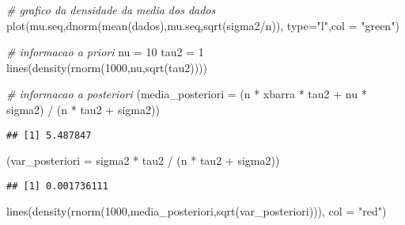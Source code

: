 \documentclass[
]{article}
\newenvironment{Shaded}{\begin{snugshade}}{\end{snugshade}}
\newcommand{\AttributeTok}[1]{\textcolor[rgb]{0.77,0.63,0.00}{#1}}
\newcommand{\CommentTok}[1]{\textcolor[rgb]{0.56,0.35,0.01}{\textit{#1}}}
\newcommand{\DecValTok}[1]{\textcolor[rgb]{0.00,0.00,0.81}{#1}}
\newcommand{\FunctionTok}[1]{\textcolor[rgb]{0.00,0.00,0.00}{#1}}
\newcommand{\NormalTok}[1]{#1}
\newcommand{\OtherTok}[1]{\textcolor[rgb]{0.56,0.35,0.01}{#1}}
\newcommand{\SpecialCharTok}[1]{\textcolor[rgb]{0.00,0.00,0.00}{#1}}
\newcommand{\StringTok}[1]{\textcolor[rgb]{0.31,0.60,0.02}{#1}}
\begin{document}
\begin{Shaded}
\begin{Highlighting}[]
 \CommentTok{\# grafico da densidade da media dos dados}
 \FunctionTok{plot}\NormalTok{(mu.seq,}\FunctionTok{dnorm}\NormalTok{(}\FunctionTok{mean}\NormalTok{(dados),mu.seq,}\FunctionTok{sqrt}\NormalTok{(sigma2}\SpecialCharTok{/}\NormalTok{n)), }\AttributeTok{type=}\StringTok{"l"}\NormalTok{,}\AttributeTok{col =} \StringTok{"green"}\NormalTok{)}

\CommentTok{\# informacao a priori}
\NormalTok{ nu }\OtherTok{=} \DecValTok{10}
\NormalTok{ tau2 }\OtherTok{=} \DecValTok{1}
 \FunctionTok{lines}\NormalTok{(}\FunctionTok{density}\NormalTok{(}\FunctionTok{rnorm}\NormalTok{(}\DecValTok{1000}\NormalTok{,nu,}\FunctionTok{sqrt}\NormalTok{(tau2))))}

  \CommentTok{\# informacao a posteriori}
\NormalTok{ (}\AttributeTok{media\_posteriori =}\NormalTok{ (n }\SpecialCharTok{*}\NormalTok{ xbarra }\SpecialCharTok{*}\NormalTok{ tau2 }\SpecialCharTok{+}\NormalTok{ nu }\SpecialCharTok{*}\NormalTok{ sigma2) }\SpecialCharTok{/}\NormalTok{ (n }\SpecialCharTok{*}\NormalTok{ tau2 }\SpecialCharTok{+}\NormalTok{ sigma2))}
\end{Highlighting}
\end{Shaded}

\begin{verbatim}
## [1] 5.487847
\end{verbatim}

\begin{Shaded}
\begin{Highlighting}[]
\NormalTok{ (}\AttributeTok{var\_posteriori =}\NormalTok{ sigma2 }\SpecialCharTok{*}\NormalTok{ tau2 }\SpecialCharTok{/}\NormalTok{ (n }\SpecialCharTok{*}\NormalTok{ tau2 }\SpecialCharTok{+}\NormalTok{ sigma2))}
\end{Highlighting}
\end{Shaded}

\begin{verbatim}
## [1] 0.001736111
\end{verbatim}

\begin{Shaded}
\begin{Highlighting}[]
 \FunctionTok{lines}\NormalTok{(}\FunctionTok{density}\NormalTok{(}\FunctionTok{rnorm}\NormalTok{(}\DecValTok{1000}\NormalTok{,media\_posteriori,}\FunctionTok{sqrt}\NormalTok{(var\_posteriori))), }\AttributeTok{col =} \StringTok{"red"}\NormalTok{)}
\end{Highlighting}
\end{Shaded}
\end{document}

